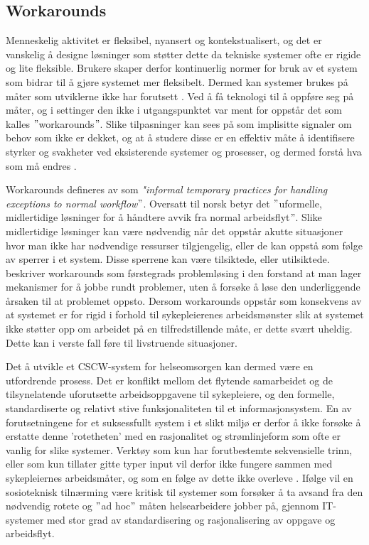 \subsection{Workarounds}
\label{sec:workarounds}
Menneskelig aktivitet er fleksibel, nyansert og kontekstualisert, og det er vanskelig å designe løsninger som støtter dette da tekniske systemer ofte er rigide og lite fleksible. Brukere skaper derfor kontinuerlig normer for bruk av et system som bidrar til å gjøre systemet mer fleksibelt. Dermed kan systemer brukes på måter som utviklerne ikke har forutsett \citep{Ackermann00}. Ved å få teknologi til å oppføre seg på måter, og i settinger den ikke i utgangspunktet var ment for oppstår det som kalles $"$workarounds$"$. Slike tilpasninger kan sees på som implisitte signaler om behov som ikke er dekket, og at å studere disse er en effektiv måte å identifisere styrker og svakheter ved eksisterende systemer og prosesser, og dermed forstå hva som må endres \citep{Coiera07}. 

\noindent
Workarounds defineres av \citet{Kobayashi05} som \emph{"informal temporary practices for handling exceptions to normal workflow$"$}. Oversatt til norsk betyr det $"$uformelle, midlertidige løsninger for å håndtere avvik fra normal arbeidsflyt$"$. Slike midlertidige løsninger kan være nødvendig når det oppstår akutte situasjoner hvor man ikke har nødvendige ressurser tilgjengelig, eller de kan oppstå som følge av sperrer i et system. Disse sperrene kan være tilsiktede, eller utilsiktede. \citet{Vogelsmeier08} beskriver workarounds som førstegrads problemløsing i den forstand at man lager mekanismer for å jobbe rundt problemer, uten å forsøke å løse den underliggende årsaken til at problemet oppsto. Dersom workarounds oppstår som konsekvens av at systemet er for rigid i forhold til sykepleierenes arbeidsmønster slik at systemet ikke støtter opp om arbeidet på en tilfredstillende måte, er dette svært uheldig. Dette kan i verste fall føre til livstruende situasjoner.

\noindent
Det å utvikle et CSCW-system for helseomsorgen kan dermed være en utfordrende prosess. Det er konflikt mellom det flytende samarbeidet og de tilsynelatende uforutsette arbeidsoppgavene til sykepleiere, og den formelle, standardiserte og relativt stive funksjonaliteten til et informasjonsystem. En av forutsetningene for et suksessfullt system i et slikt miljø er derfor å ikke forsøke å erstatte denne 'rotetheten' med en rasjonalitet og strømlinjeform som ofte er vanlig for slike systemer. Verktøy som kun har forutbestemte sekvensielle trinn, eller som kun tillater gitte typer input vil derfor ikke fungere sammen med sykepleiernes arbeidsmåter, og som en følge av dette ikke overleve \citep{Berg99}.
Ifølge \citet{Berg99} vil en sosioteknisk tilnærming være kritisk til systemer som forsøker å ta avsand fra den nødvendig rotete og $"$ad hoc$"$ måten helsearbeidere jobber på, gjennom IT-systemer med stor grad av standardisering og rasjonalisering av oppgave og arbeidsflyt.

